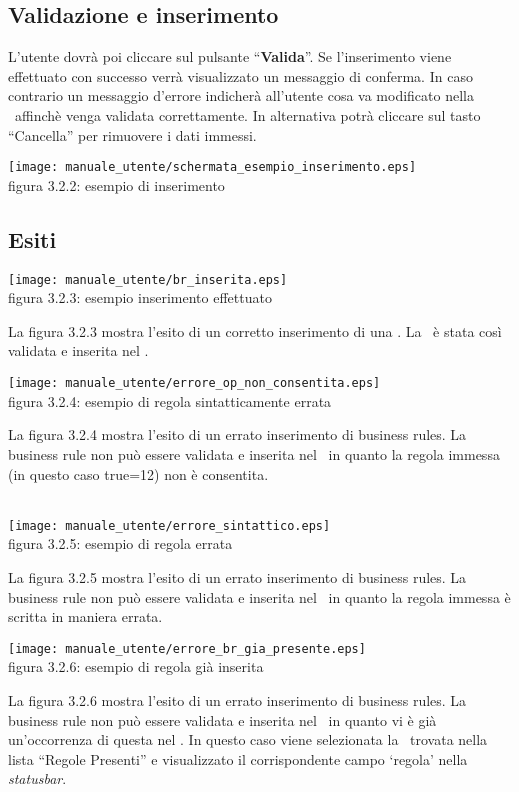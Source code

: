 \subsection{Validazione e inserimento}
L'utente dovr\`a poi cliccare sul pulsante ``\textbf{Valida}''. Se l'inserimento viene effettuato con successo verr\`a visualizzato un messaggio di conferma. In caso contrario un messaggio d'errore indicher\`a all'utente cosa va modificato nella \br\ affinch\`e venga validata correttamente. In alternativa potr\`a cliccare sul tasto ``Cancella'' per rimuovere i dati immessi.
\begin{center}
\texttt{[image: manuale\_utente/schermata\_esempio\_inserimento.eps]}\\
 figura 3.2.2: esempio di inserimento
\end{center} 
\subsection{Esiti}
\begin{center}
\texttt{[image: manuale\_utente/br\_inserita.eps]}\\
 figura 3.2.3: esempio inserimento effettuato
\end{center} 
La figura 3.2.3 mostra l'esito di un corretto inserimento di una \br. La \br\ \`e stata cos\`i validata e inserita nel \rp.

\begin{center}
\texttt{[image: manuale\_utente/errore\_op\_non\_consentita.eps]}\\
 figura 3.2.4: esempio di regola sintatticamente errata 
\end{center} 
La figura 3.2.4 mostra l'esito di un errato inserimento di business rules. La business rule non pu\`o essere validata e inserita nel \rp\ in quanto la regola immessa (in questo caso true=12) non \`e consentita.
\\
\\
\begin{center}
\texttt{[image: manuale\_utente/errore\_sintattico.eps]}\\
 figura 3.2.5: esempio di regola errata
\end{center} 
La figura 3.2.5 mostra l'esito di un errato inserimento di business rules. La business rule non pu\`o essere validata e inserita nel \rp\ in quanto la regola immessa \`e scritta in maniera errata.

\begin{center}
\texttt{[image: manuale\_utente/errore\_br\_gia\_presente.eps]}\\
 figura 3.2.6: esempio di regola gi\`a inserita
\end{center} 
La figura 3.2.6 mostra l'esito di un errato inserimento di business rules. La business rule non pu\`o essere validata e inserita nel \rp\ in quanto vi \`e gi\`a un'occorrenza di questa nel \rp. In questo caso viene selezionata la \br\ trovata nella lista ``Regole Presenti'' e visualizzato il corrispondente campo `regola' nella \textit{statusbar}.

